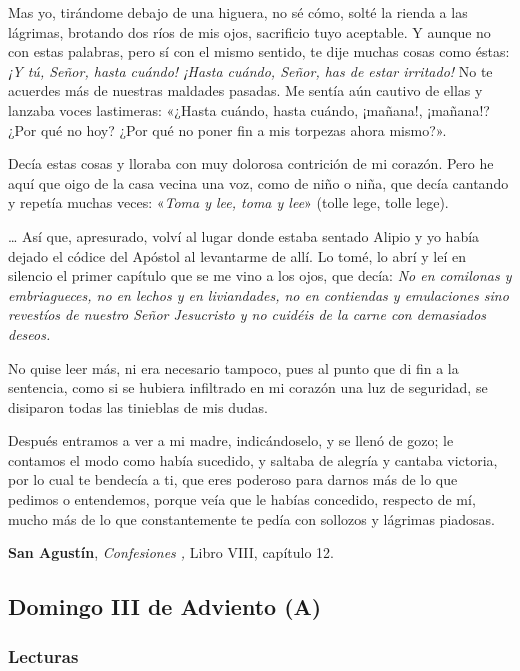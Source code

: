 \documentclass[]{article}
\begin{document}
Mas yo, tirándome debajo de una higuera, no sé cómo, solté la rienda a
las lágrimas, brotando dos ríos de mis ojos, sacrificio tuyo aceptable.
Y aunque no con estas palabras, pero sí con el mismo sentido, te dije
muchas cosas como éstas: \emph{¡Y tú, Señor, hasta cuándo! ¡Hasta
cuándo, Señor, has de estar irritado!} No te acuerdes más de nuestras
maldades pasadas. Me sentía aún cautivo de ellas y lanzaba voces
lastimeras: «¿Hasta cuándo, hasta cuándo, ¡mañana!, ¡mañana!? ¿Por qué
no hoy? ¿Por qué no poner fin a mis torpezas ahora mismo?».

Decía estas cosas y lloraba con muy dolorosa contrición de mi corazón.
Pero he aquí que oigo de la casa vecina una voz, como de niño o niña,
que decía cantando y repetía muchas veces: «\emph{Toma y lee, toma y
lee}» (tolle lege, tolle lege).

\ldots{} Así que, apresurado, volví al lugar donde estaba sentado Alipio
y yo había dejado el códice del Apóstol al levantarme de allí. Lo tomé,
lo abrí y leí en silencio el primer capítulo que se me vino a los ojos,
que decía: \emph{No en comilonas y embriagueces, no en lechos y en
liviandades, no en contiendas y emulaciones sino revestíos de nuestro
Señor Jesucristo y no cuidéis de la carne con demasiados deseos.}

No quise leer más, ni era necesario tampoco, pues al punto que di fin a
la sentencia, como si se hubiera infiltrado en mi corazón una luz de
seguridad, se disiparon todas las tinieblas de mis dudas.

Después entramos a ver a mi madre, indicándoselo, y se llenó de gozo; le
contamos el modo como había sucedido, y saltaba de alegría y cantaba
victoria, por lo cual te bendecía a ti, que eres poderoso para darnos
más de lo que pedimos o entendemos, porque veía que le habías concedido,
respecto de mí, mucho más de lo que constantemente te pedía con sollozos
y lágrimas piadosas.

\textbf{San Agustín}, \emph{Confesiones ,} Libro VIII, capítulo 12.

\subsection{Domingo III de Adviento
(A)}\label{domingo-iii-de-adviento-a}

\subsubsection{Lecturas}\label{lecturas-2}
\end{document}
